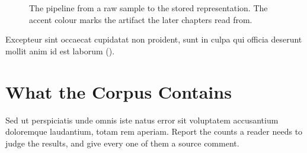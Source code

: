 \begin{figure}[htbp]
  \centering
  \caption[The corpus pipeline]{The pipeline from a raw sample to the stored representation. The accent colour marks the artifact the later chapters read from.}
  \label{fig:data-pipeline}
\end{figure}

Excepteur sint occaecat cupidatat non proident, sunt in culpa qui officia deserunt mollit anim id est laborum ().

\section{What the Corpus Contains}
\label{sec:data-stats}

Sed ut perspiciatis unde omnis iste natus error sit voluptatem accusantium doloremque laudantium, totam rem aperiam.
Report the counts a reader needs to judge the results, and give every one of them a source comment.
